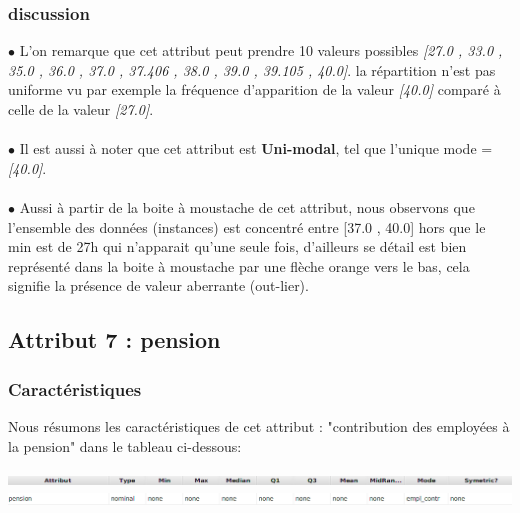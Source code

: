 \documentclass[12pt,a4paper,oneside]{book}
\begin{document}
\subsubsection{discussion}
$\bullet $ L'on remarque que cet attribut peut prendre 10 valeurs possibles \textit{[27.0 , 33.0 , 35.0 , 36.0 , 37.0 , 37.406 , 38.0 , 39.0 , 39.105 , 40.0]}. la répartition n'est pas uniforme vu par exemple la fréquence d'apparition de la valeur \textit{[40.0]} comparé à celle de la valeur \textit{[27.0]}.\\
\textbf{ }\\
$\bullet $ Il est aussi à noter que cet attribut est \textbf{Uni-modal}, tel que l'unique mode = \textit{[40.0]}.\\
\textbf{ }\\
$\bullet $ Aussi à partir de la boite à moustache de cet attribut, nous observons que l'ensemble des données (instances) est concentré entre [37.0 , 40.0] hors que le min est de 27h qui n'apparait qu'une seule fois, d'ailleurs se détail est bien représenté dans la boite à moustache par une flèche orange vers le bas, cela signifie la présence de valeur aberrante (out-lier). 

\newpage


\subsection{Attribut 7 : pension }
\subsubsection{Caractéristiques}
Nous résumons les caractéristiques de cet attribut : "contribution des employées à la pension" dans le tableau ci-dessous:
\begin{center}
	\includegraphics[width=1\textwidth]{screens/att.png}\\ \includegraphics[width=1\textwidth]{screens/att-7.png}%
	\label{labelname}%
\end{center}
\end{document}
